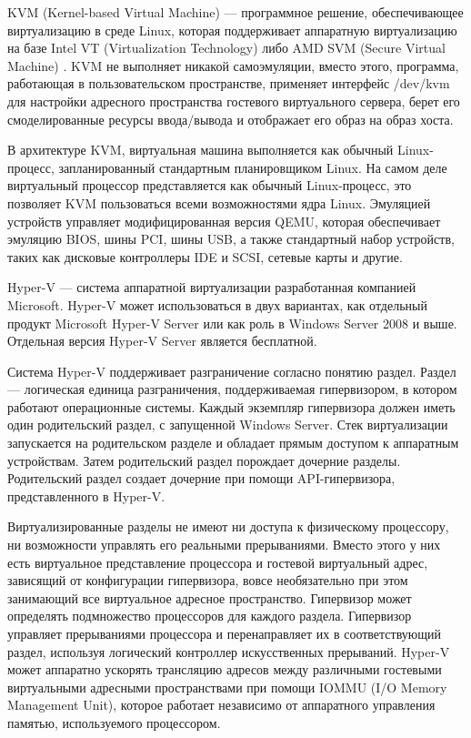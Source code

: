 KVM (Kernel-based Virtual Machine) --- программное решение, обеспечивающее виртуализацию в среде Linux, которая поддерживает аппаратную виртуализацию на базе Intel VT (Virtualization Technology) либо AMD SVM (Secure Virtual Machine) \cite{kvm-ibm}.
KVM не выполняет никакой самоэмуляции, вместо этого, программа, работающая в пользовательском пространстве, применяет интерфейс /dev/kvm для настройки адресного пространства гостевого виртуального сервера, берет его смоделированные ресурсы ввода/вывода и отображает его образ на образ хоста.

В архитектуре KVM, виртуальная машина выполняется как обычный Linux-процесс, запланированный стандартным планировщиком Linux.
На самом деле виртуальный процессор представляется как обычный Linux-процесс, это позволяет KVM пользоваться всеми возможностями ядра Linux.
Эмуляцией устройств управляет модифицированная версия QEMU, которая обеспечивает эмуляцию BIOS, шины PCI, шины USB, а также стандартный набор устройств, таких как дисковые контроллеры IDE и SCSI, сетевые карты и другие.

Hyper-V --- система аппаратной виртуализации разработанная компанией Microsoft.
Hyper-V может использоваться в двух вариантах, как отдельный продукт Microsoft Hyper-V Server или как роль в Windows Server 2008 и выше.
Отдельная версия Hyper-V Server является бесплатной.

Система Hyper-V поддерживает разграничение согласно понятию раздел.
Раздел --- логическая единица разграничения, поддерживаемая гипервизором, в котором работают операционные системы.
Каждый экземпляр гипервизора должен иметь один родительский раздел, с запущенной Windows Server.
Стек виртуализации запускается на родительском разделе и обладает прямым доступом к аппаратным устройствам.
Затем родительский раздел порождает дочерние разделы.
Родительский раздел создает дочерние при помощи API-гипервизора, представленного в Hyper-V.

Виртуализированные разделы не имеют ни доступа к физическому процессору, ни возможности управлять его реальными прерываниями.
Вместо этого у них есть виртуальное представление процессора и гостевой виртуальный адрес, зависящий от конфигурации гипервизора, вовсе необязательно при этом занимающий все виртуальное адресное пространство.
Гипервизор может определять подмножество процессоров для каждого раздела.
Гипервизор управляет прерываниями процессора и перенаправляет их в соответствующий раздел, используя логический контроллер искусственных прерываний.
Hyper-V может аппаратно ускорять трансляцию адресов между различными гостевыми виртуальными адресными пространствами при помощи IOMMU (I/O Memory Management Unit), которое работает независимо от аппаратного управления памятью, используемого процессором.

